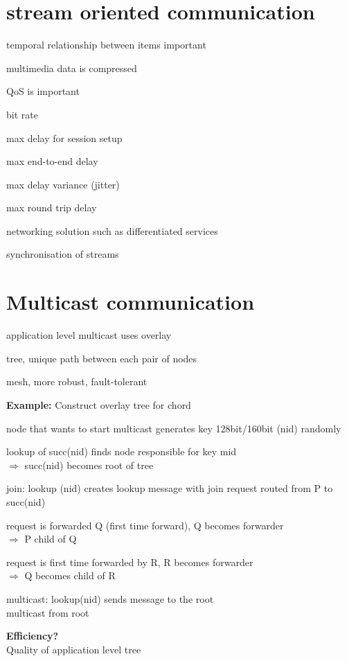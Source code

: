 \documentclass[ngerman,a4paper]{report}
\begin{document}
\section{stream oriented communication}
\begin{compactitem}
	\item temporal relationship between items important
	\item multimedia data is compressed
	\item QoS is important\\
		\begin{compactitem}
			\item bit rate
			\item max delay for session setup
			\item max end-to-end delay
			\item max delay variance (jitter)
			\item max round trip delay\\
		\end{compactitem}
	\item networking solution such as differentiated services
	\item synchronisation of streams
\end{compactitem}
\section{Multicast communication}
\begin{compactitem}
	\item application level multicast uses overlay
	\item tree, unique path between each pair of nodes
	\item mesh, more robust, fault-tolerant
\end{compactitem}
\textbf{Example:} Construct overlay tree for chord
\begin{compactitem}
	\item node that wants to start multicast generates key 128bit/160bit (nid) randomly
	\item lookup of succ(nid) finds node responsible for key mid\\
		$\Rightarrow$ succ(nid) becomes root of tree
	\item join: lookup (nid) creates lookup message with join request routed from P to succ(nid)
	\item request is forwarded Q (first time forward), Q becomes forwarder\\
		$\Rightarrow$ P child of Q
	\item request is first time forwarded by R, R becomes forwarder\\
		$\Rightarrow$ Q becomes child of R
	\item multicast: lookup(nid) sends message to the root\\
		multicast from root
\end{compactitem}
\textbf{Efficiency?}\\
Quality of application level tree\\
\end{document}
